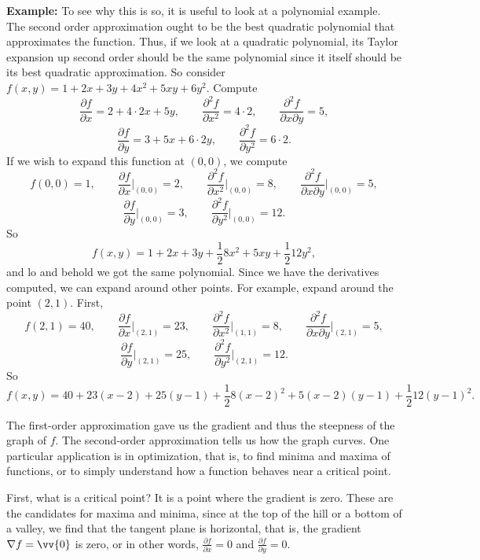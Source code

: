 \documentclass[12pt]{article}
\begin{document}
\medskip

\textbf{Example:}
To see why this is so, it is useful to look at a polynomial example.  The
second order approximation ought to be the best quadratic polynomial that
approximates the function.
Thus, if we look at a quadratic polynomial,
its Taylor expansion up second order should be the
same polynomial
since it itself should be its best
quadratic approximation.
So consider $f(x,y) = 1 + 2x + 3y + 4x^2+ 5xy + 6y^2$.  Compute
\[
\frac{\partial f}{\partial x} = 2 + 4 \cdot 2x + 5y, \qquad
\frac{\partial^2 f}{\partial x^2} = 4 \cdot 2, \qquad
\frac{\partial^2 f}{\partial x \partial y} = 5 ,
\]
\[
\frac{\partial f}{\partial y} = 3 + 5x + 6 \cdot 2y, \qquad
\frac{\partial^2 f}{\partial y^2} = 6 \cdot 2 .
\]
If we wish to expand this function at $(0,0)$, we compute
\[
f(0,0) = 1, \qquad
\frac{\partial f}{\partial x}\Big|_{(0,0)} = 2, \qquad
\frac{\partial^2 f}{\partial x^2}\Big|_{(0,0)} = 8, \qquad
\frac{\partial^2 f}{\partial x \partial y}\Big|_{(0,0)} = 5 ,
\]
\[
\frac{\partial f}{\partial y}\Big|_{(0,0)} = 3, \qquad
\frac{\partial^2 f}{\partial y^2}\Big|_{(0,0)} = 12 .
\]
So
\[
f(x,y) = 1 + 2 x + 3 y + \frac{1}{2} 8 x^2 + 5 xy + \frac{1}{2} 12 y^2 ,
\]
and lo and behold we got the same polynomial.
Since we have the derivatives computed, we can expand around other
points.  For example, expand around the point $(2,1)$.  First,
\[
f(2,1) = 40, \qquad
\frac{\partial f}{\partial x}\Big|_{(2,1)} = 23, \qquad
\frac{\partial^2 f}{\partial x^2}\Big|_{(1,1)} = 8, \qquad
\frac{\partial^2 f}{\partial x \partial y}\Big|_{(2,1)} = 5 ,
\]
\[
\frac{\partial f}{\partial y}\Big|_{(2,1)} = 25, \qquad
\frac{\partial^2 f}{\partial y^2}\Big|_{(2,1)} = 12 .
\]
So
\[
f(x,y) = 40 + 23(x-2) + 25 (y-1) + \frac{1}{2} 8 (x-2)^2 + 5 (x-2)(y-1) +
\frac{1}{2} 12 (y-1)^2 .
\]

\medskip

The first-order approximation gave us the gradient and thus the
steepness of the graph of $f$.  The second-order approximation tells us how
the graph curves.  One particular application is in optimization, that is,
to find minima and maxima of functions, or to simply understand how a
function behaves near a critical point.

First, what is a critical point?  It is a point where the gradient is zero.
These are the candidates for maxima and minima, since at the top of the
hill or a bottom of a valley, we find that the tangent plane is horizontal,
that is, the gradient $\nabla f = \vv{0}$ is zero,
or in other words,
$\frac{\partial f}{\partial x} = 0$ and
$\frac{\partial f}{\partial y} = 0$.
\end{document}
